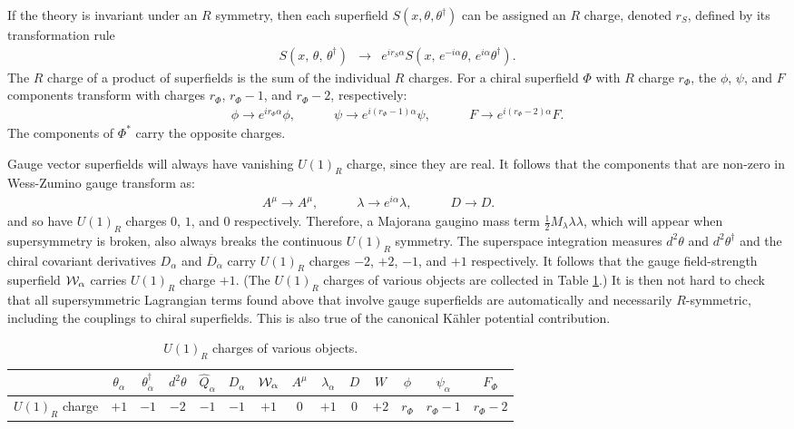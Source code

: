 \documentclass[11pt]{article}
\def\beq{\begin{eqnarray}}
\def\eeq{\end{eqnarray}}
\def\Dcon{\overline D}
\begin{document}
If the theory is invariant under an $R$ symmetry, then each superfield $S(x,\theta,\theta^\dagger)$ can be assigned an $R$ charge, denoted $r_S$, defined by its transformation rule
\beq
S(x,\,\theta,\,\theta^\dagger) &\rightarrow& 
e^{i r_S \alpha} S(x,\, e^{-i \alpha} \theta,\, e^{i\alpha}\theta^\dagger).
\eeq
The $R$ charge of a product of superfields is the sum of the individual $R$ charges.
For a chiral superfield $\Phi$ with $R$ charge $r_\Phi$, the $\phi$, $\psi$, and $F$ 
components transform with charges $r_\Phi$, $r_\Phi -1$, and $r_\Phi-2$, respectively:
\beq
\phi \rightarrow e^{ir_\Phi\alpha} \phi,\qquad\quad
\psi \rightarrow e^{i(r_\Phi - 1)\alpha} \psi,\qquad\quad
F \rightarrow e^{i(r_\Phi - 2)\alpha} F.
\eeq
The components of $\Phi^*$ carry the opposite charges.

Gauge vector superfields will always have vanishing $U(1)_R$ charge, since they are 
real. It follows that the components that are non-zero in Wess-Zumino 
gauge transform as:
\beq
A^\mu \rightarrow A^\mu,\qquad\quad
\lambda \rightarrow e^{i\alpha} \lambda,\qquad\quad
D \rightarrow D.\qquad\quad
\label{eq:Rchargesvector}
\eeq
and so have $U(1)_R$ charges $0$, $1$, and $0$ respectively.
Therefore, a Majorana gaugino mass term $\frac{1}{2} M_\lambda \lambda\lambda$, 
which will appear when supersymmetry is broken, also always breaks the 
continuous $U(1)_R$ symmetry.
The superspace integration measures $d^2\theta$ and $d^2\theta^\dagger$ 
and the chiral covariant derivatives $D_\alpha$ and 
$\Dcon_{\dot\alpha}$ carry $U(1)_R$ charges $-2$, $+2$, $-1$, and $+1$ 
respectively. It follows that the gauge field-strength superfield 
${\cal W}_\alpha$ carries $U(1)_R$ charge $+1$. (The $U(1)_R$ charges of various
objects are collected in Table \ref{table:Rcharges}.) 
It is then not hard to check that all 
supersymmetric Lagrangian terms found above that involve gauge superfields are 
automatically and necessarily $R$-symmetric, including the couplings to 
chiral superfields. This is also true of the canonical K\"ahler potential
contribution.%
\renewcommand{\arraystretch}{1.4}
\begin{table}[tb]
\begin{center}
%
\begin{tabular}{|c|c|c|c|c|c|c|c|c|c|c|c|c|c|}
\hline
& $\theta_\alpha$ 
& $\theta^\dagger_{\dot\alpha}$
& $d^2\theta$
& $\hat Q_\alpha$ 
& $D_\alpha$ 
& ${\cal W}_\alpha$
& $A^\mu$ 
& $\lambda_\alpha$ 
& $D$ 
& $W$
& $\phi$ 
& $\psi_\alpha$
& $F_\Phi$
\\ \hline 
$U(1)_R$ charge 
& $+1$ 
& $-1$ 
& $-2$ 
& $-1$ 
& $-1$ 
& $+1$ 
& $0$ 
& $+1$ 
& $0$ 
& $+2$ 
& $r_\Phi$ 
& $r_\Phi-1$ 
& $r_\Phi-2$
\\ \hline
\end{tabular}
%
\caption{$U(1)_R$ charges of various objects.\label{table:Rcharges}} 
\end{center}
\end{table}
\end{document}
